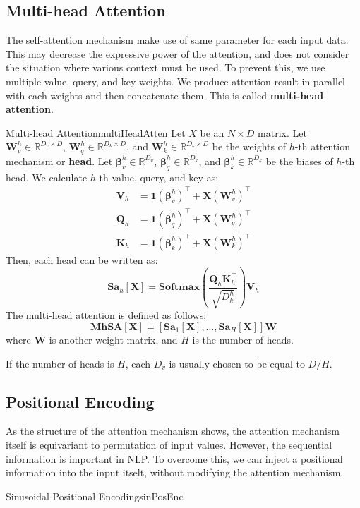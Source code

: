 \documentclass{article}
\begin{document}
    \subsection{Multi-head Attention}
        The self-attention mechanism make use of same parameter for each input data.
        This may decrease the expressive power of the attention, and does not consider
        the situation where various context must be used.
        To prevent this, we use multiple value, query, and key weights.
        We produce attention result in parallel with each weights and then concatenate them.
        This is called \textbf{multi-head attention}.
        \begin{defn}{Multi-head Attention}{multiHeadAtten}
            Let $X$ be an $N \times D$ matrix.
            Let $\textbf{W}_v^h \in \mathbb{R}^{D_v \times D}$, $\textbf{W}_q^h \in \mathbb{R}^{D_k \times D}$,
            and $\textbf{W}_k^h \in \mathbb{R}^{D_k \times D}$ be the weights of $h$-th attention mechanism or \textbf{head}.
            Let $\bm{\beta}_v^h \in \mathbb{R}^{D_v}$, $\bm{\beta}_q^h \in \mathbb{R}^{D_k}$,
            and $\bm{\beta}_k^h \in \mathbb{R}^{D_k}$ be the biases of $h$-th head.
            We calculate $h$-th value, query, and key as:
            \begin{align*}
                \textbf{V}_h &= \textbf{1}(\bm{\beta}_v^h)^{\top} + \textbf{X}(\textbf{W}_v^h)^{\top}\\
                \textbf{Q}_h &= \textbf{1}(\bm{\beta}_q^h)^{\top} + \textbf{X}(\textbf{W}_q^h)^{\top}\\
                \textbf{K}_h &= \textbf{1}(\bm{\beta}_k^h)^{\top} + \textbf{X}(\textbf{W}_k^h)^{\top}
            \end{align*}
            Then, each head can be written as:
            \[
                \textbf{Sa}_h[\textbf{X}]=\textbf{Softmax}\left(\frac{\textbf{Q}_h\textbf{K}_h^{\top}}{\sqrt{D_k^h}}\right)\textbf{V}_h
            \]
            The multi-head attention is defined as follows;
            \[
                \textbf{MhSA}[\textbf{X}] = [\textbf{Sa}_1[\textbf{X}], \dots, \textbf{Sa}_H[\textbf{X}]]\textbf{W}
            \]
            where \textbf{W} is another weight matrix, and $H$ is the number of heads.
        \end{defn}
        If the number of heads is $H$, each $D_v$ is usually chosen to be equal to $D/H$.

    \subsection{Positional Encoding}
        As the structure of the attention mechanism shows, the attention mechanism itself is equivariant to
        permutation of input values. However, the sequential information is important in NLP. To overcome this,
        we can inject a positional information into the input itselt, without modifying the attention mechanism.

        \begin{defn}{Sinusoidal Positional Encoding}{sinPosEnc}
        \end{defn}
\end{document}
